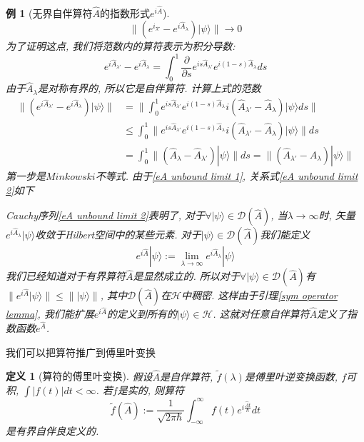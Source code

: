 \documentclass[a4paper,11pt]{book}
\newtheorem{definition}{\hspace{2em}定义}[section]
\newtheorem{example}{例}[section]
\begin{document}
\begin{example}[无界自伴算符$\hat{A}$的指数形式$e^{i\hat{A}}$]
\begin{equation*}
    \|(e^{i\hat{_{\lambda'}}}-e^{i\hat{A}_\lambda})|\psi\rangle\|\to0
  \end{equation*}
  为了证明这点, 我们将范数内的算符表示为积分导数:
  \begin{equation*}
    e^{i\hat{A}_{\lambda'}}-e^{i\hat{A}_\lambda}=\int_{0}^{1}\frac{\partial}{\partial s}e^{is\hat{A}_{\lambda'}}e^{i(1-s)\hat{A}_\lambda}ds
  \end{equation*}
  由于$\hat{A}_\lambda$是对称有界的, 所以它是自伴算符. 计算上式的范数
  \begin{equation*}
    \begin{split}
       \|(e^{i\hat{A}_{\lambda'}}-e^{i\hat{A}_\lambda})|\psi\rangle\|&=\|\int_{0}^{1}e^{is\hat{A}_{\lambda'}}e^{i(1-s)\hat{A}_\lambda}i(\hat{A}_{\lambda'}-\hat{A}_\lambda)|\psi\rangle ds\|\\
         &\leq\int_{0}^{1}\|e^{is\hat{A}_{\lambda'}}e^{i(1-s)\hat{A}_\lambda}i(\hat{A}_{\lambda'}-\hat{A}_\lambda)|\psi\rangle\|ds\\
         &=\int_{0}^{1}\|(\hat{A}_\lambda-\hat{A}_{\lambda'})|\psi\rangle\|ds=\|(\hat{A}_{\lambda'}-\hat{A}_\lambda)|\psi\rangle\|
    \end{split}
  \end{equation*}
  第一步是$Minkowski$不等式. 由于\eqref{eA unbound limit 1}, 关系式\eqref{eA unbound limit 2}如下

  \indent Cauchy序列\eqref{eA unbound limit 2}表明了, 对于$\forall|\psi\rangle\in\mathcal{D}(\hat{A})$, 当$\lambda\to\infty$时, 矢量$e^{i\hat{A}_\lambda}|\psi\rangle$收敛于Hilbert空间中的某些元素. 对于$|\psi\rangle\in\mathcal{D}(\hat{A})$我们能定义
  \begin{equation*}
    e^{i\hat{A}}|\psi\rangle:=\lim_{\lambda\to\infty}e^{i\hat{A}_\lambda}|\psi\rangle
  \end{equation*}
  我们已经知道对于有界算符$\hat{A}$是显然成立的. 所以对于$\forall|\psi\rangle\in\mathcal{D}(\hat{A})$有$\|e^{i\hat{A}}|\psi\rangle\|\leq\||\psi\rangle\|$, 其中$\mathcal{D}(\hat{A})$在$\mathcal{H}$中稠密. 这样由于引理\ref{sym operator lemma}, 我们能扩展$e^{i\hat{A}}$的定义到所有的$|\psi\rangle\in\mathcal{H}$. 这就对任意自伴算符$\hat{A}$定义了指数函数$e^{\hat{A}}$.
\end{example}
我们可以把算符推广到傅里叶变换
\begin{definition}[算符的傅里叶变换]
  假设$\hat{A}$是自伴算符, $\tilde{f}(\lambda)$是傅里叶逆变换函数, $f$可积, $\int|f(t)|dt<\infty$. 若$f$是实的, 则算符
  \begin{equation*}
    \tilde{f}(\hat{A}):=\frac{1}{\sqrt{2\pi\hbar}}\int_{-\infty}^{\infty}f(t)e^{i\frac{\hat{A}t}{\hbar}}dt
  \end{equation*}
  是有界自伴良定义的.
\end{definition}
\end{document}

